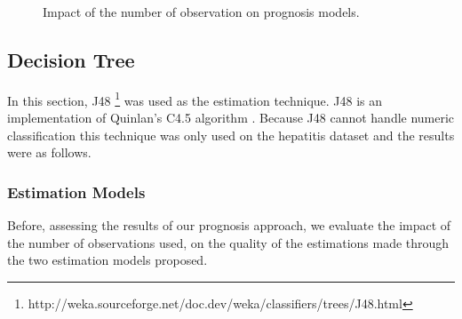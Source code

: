  \begin{figure}[h]
  \begin{subfigmatrix}{2}
  \end{subfigmatrix}
  \caption{Impact of the number of observation on prognosis models.}
  \label{fig:impactregression}
\end{figure}
	
 \subsection{Decision Tree}
\label{subsection:dt}

In this section, J48 \footnote{http://weka.sourceforge.net/doc.dev/weka/classifiers/trees/J48.html} was used as the estimation technique. J48 is an implementation of Quinlan's C4.5 algorithm \cite{Quinlan1993}. Because J48 cannot handle numeric classification this technique was only used on the hepatitis dataset and the results were as follows.

\subsubsection{Estimation Models}
\label{subsubsection:estimation_dt}

Before, assessing the results of our prognosis approach, we evaluate the impact of the number of observations used, on the 
quality of the estimations made through the two estimation models proposed.

